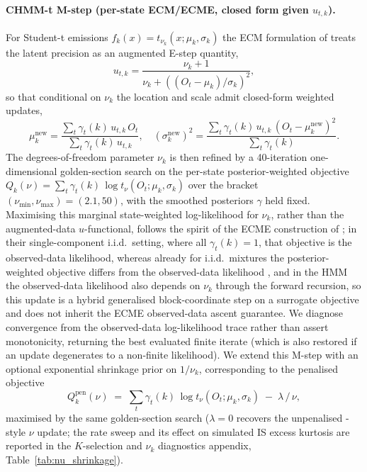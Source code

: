 \paragraph{CHMM-t M-step (per-state ECM/ECME, closed form given $u_{t,k}$).}
For Student-t emissions $f_k(x) = t_{\nu_k}(x; \mu_k, \sigma_k)$ the ECM formulation of \citet{peel2000robust, liu1995ml} treats the latent precision as an augmented E-step quantity,
\begin{equation}
    u_{t,k} = \frac{\nu_k + 1}{\nu_k + ((O_t - \mu_k)/\sigma_k)^2},
    \label{eq:tprecision_supp}
\end{equation}
so that conditional on $\nu_k$ the location and scale admit closed-form weighted updates,
\begin{equation}
    \mu_k^{\text{new}} = \frac{\sum_t \gamma_t(k)\, u_{t,k}\, O_t}{\sum_t \gamma_t(k)\, u_{t,k}},\quad
    \left(\sigma_k^{\text{new}}\right)^2 = \frac{\sum_t \gamma_t(k)\, u_{t,k}\, (O_t - \mu_k^{\text{new}})^2}{\sum_t \gamma_t(k)}.
    \label{eq:tupdate_supp}
\end{equation}
The degrees-of-freedom parameter $\nu_k$ is then refined by a 40-iteration one-dimensional golden-section search on the per-state posterior-weighted objective $Q_k(\nu) = \sum_t \gamma_t(k)\, \log t_\nu(O_t; \mu_k, \sigma_k)$ over the bracket $(\nu_{\min}, \nu_{\max}) = (2.1, 50)$, with the smoothed posteriors $\gamma$ held fixed. Maximising this marginal state-weighted log-likelihood for $\nu_k$, rather than the augmented-data $u$-functional, follows the spirit of the ECME construction of \citet{liu1995ml}; in their single-component i.i.d.\ setting, where all $\gamma_t(k) = 1$, that objective is the observed-data likelihood, whereas already for i.i.d.\ mixtures the posterior-weighted objective differs from the observed-data likelihood \citep{peel2000robust}, and in the HMM the observed-data likelihood also depends on $\nu_k$ through the forward recursion, so this update is a hybrid generalised block-coordinate step on a surrogate objective and does not inherit the ECME observed-data ascent guarantee. We diagnose convergence from the observed-data log-likelihood trace rather than assert monotonicity, returning the best evaluated finite iterate (which is also restored if an update degenerates to a non-finite likelihood).
We extend this M-step with an optional exponential shrinkage prior on $1/\nu_k$, corresponding to the penalised objective
\begin{equation}
    Q_k^{\text{pen}}(\nu) \;=\; \sum_t \gamma_t(k)\, \log t_\nu(O_t; \mu_k, \sigma_k) \;-\; \lambda \, / \, \nu,
    \label{eq:nu_pen}
\end{equation}
maximised by the same golden-section search ($\lambda = 0$ recovers the unpenalised \citet{peel2000robust, liu1995ml}-style $\nu$ update; the rate sweep and its effect on simulated IS excess kurtosis are reported in the $K$-selection and $\nu_k$ diagnostics appendix, Table~\ref{tab:nu_shrinkage}).

